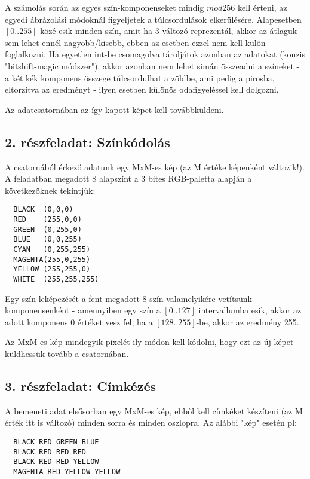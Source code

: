 \documentclass[12pt]{article}
\begin{document}
A számolás során az egyes szín-komponenseket mindig $mod 256$ kell érteni, az egyedi ábrázolási módoknál figyeljetek a túlcsordulások elkerülésére. Alapesetben $[0..255]$ közé esik minden szín, amit ha 3 változó reprezentál, akkor az átlaguk sem lehet ennél nagyobb/kisebb, ebben az esetben ezzel nem kell külön foglalkozni. Ha egyetlen int-be csomagolva tároljátok azonban az adatokat (konzis "bitshift-magic módszer"), akkor azonban nem lehet simán összeadni a színeket - a két kék komponens összege túlcsordulhat a zöldbe, ami pedig a pirosba, eltorzítva az eredményt - ilyen esetben különös odafigyeléssel kell dolgozni.

Az adatcsatornában az így kapott képet kell továbbküldeni.

\subsection{2. részfeladat: Színkódolás}

A csatornából érkező adatunk egy MxM-es kép (az M értéke képenként változik!). A feladatban megadott 8 alapszínt a 3 bites RGB-paletta alapján a következőknek tekintjük:

\begin{verbatim}
  BLACK  (0,0,0)
  RED    (255,0,0)
  GREEN  (0,255,0)
  BLUE   (0,0,255)
  CYAN   (0,255,255)
  MAGENTA(255,0,255)
  YELLOW (255,255,0)
  WHITE  (255,255,255)
\end{verbatim}

Egy szín leképezését a fent megadott 8 szín valamelyikére vetítsünk komponensenként - amennyiben egy szín a $[0..127]$ intervallumba esik, akkor az adott komponens 0 értéket vesz fel, ha a $[128..255]$-be, akkor az eredmény 255.

Az MxM-es kép mindegyik pixelét ily módon kell kódolni, hogy ezt az új képet küldhessük tovább a csatornában.

\subsection{3. részfeladat: Címkézés}

A bemeneti adat elsősorban egy MxM-es kép, ebből kell címkéket készíteni (az M érték itt is változó) minden sorra és minden oszlopra. Az alábbi "kép" esetén pl:

\begin{verbatim}
  BLACK RED GREEN BLUE
  BLACK RED RED RED
  BLACK RED RED YELLOW
  MAGENTA RED YELLOW YELLOW
\end{verbatim}
\end{document}
